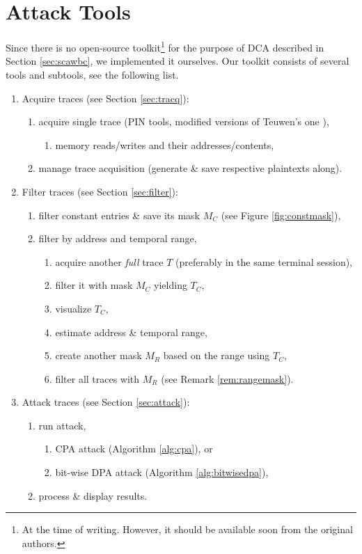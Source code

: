 \section{Attack Tools}
\label{sec:tools}

Since there is no open-source toolkit\footnote{At the time of writing. However, it should be available soon from the original authors.} for the purpose of DCA described in Section \ref{sec:scawbc}, we implemented it ourselves. Our toolkit consists of several tools and subtools, see the following list.


\begin{enumerate}
	\item Acquire traces (see Section \ref{sec:tracq}):
	\begin{enumerate}
		\item acquire single trace (PIN tools, modified versions of Teuwen's one \cite{teuwen2015movfuscator}),
		\begin{enumerate}
			\item memory reads/writes and their addresses/contents,
		\end{enumerate}
		\item manage trace acquisition (generate \& save respective plaintexts along).
	\end{enumerate}
	\item Filter traces (see Section \ref{sec:filter}):
	\begin{enumerate}
		\item filter constant entries \& save its mask $M_C$ (see Figure \ref{fig:constmask}),
		\item filter by address and temporal range,
		\begin{enumerate}
			\item acquire another {\em full} trace $T$ (preferably in the same terminal session),
			\item filter it with mask $M_C$ yielding $T_C$,
			\item visualize $T_C$,
			\item estimate address \& temporal range,
			\item create another mask $M_R$ based on the range using $T_C$,
			\item filter all traces with $M_R$ (see Remark \ref{rem:rangemask}).
		\end{enumerate}
	\end{enumerate}
	\item Attack traces (see Section \ref{sec:attack}):
	\begin{enumerate}
		\item run attack,
		\begin{enumerate}
			\item CPA attack (Algorithm \ref{alg:cpa}), or
			\item bit-wise DPA attack (Algorithm \ref{alg:bitwisedpa}),
		\end{enumerate}
		\item process \& display results.
	\end{enumerate}
\end{enumerate}
